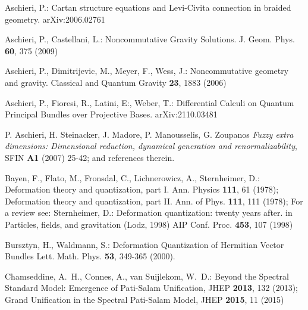 \documentclass[a4paper,11pt]{article}
\begin{document}
\begin{thebibliography}{99}

Aschieri, P.:\newblock
Cartan structure equations and Levi-Civita connection in braided geometry.\newblock
arXiv:2006.02761

Aschieri, P., Castellani, L.:\newblock
Noncommutative Gravity Solutions.
\newblock J. Geom. Phys. \textbf{60}, 375
(2009)

Aschieri, P., Dimitrijevic, M., Meyer, F., Wess, J.:\newblock
Noncommutative geometry and gravity.
\newblock Classical and Quantum Gravity \textbf{23}, 1883
(2006)	

Aschieri, P., Fioresi, R., Latini, E:, Weber, T.:\newblock
Differential Calculi on Quantum Principal Bundles over Projective Bases.\newblock
arXiv:2110.03481


P. Aschieri,  H. Steinacker, J. Madore,   P. Manousselis, G. Zoupanos
{\it Fuzzy extra dimensions: Dimensional reduction, dynamical generation and renormalizability},
SFIN {\bf A1} (2007) 25-42;
and references therein.

Bayen, F., Flato, M., Fronsdal, C., Lichnerowicz, A.,
Sternheimer, D.:
\newblock Deformation theory and quantization, part I.
Ann. Physics \textbf{111}, 61
(1978); 
Deformation theory and quantization, part II. Ann. of Phys. \textbf{111}, 111
(1978);
For a review see: Sternheimer, D.:
Deformation quantization: twenty years after.
in Particles, fields, and gravitation (Lodz, 1998)
AIP Conf. Proc. \textbf{453}, 107
(1998)

Bursztyn, H., Waldmann, S.:\newblock
Deformation Quantization of Hermitian Vector Bundles
\newblock Lett. Math. Phys. \textbf{53}, 349-365 (2000).

Chamseddine, A.~H., Connes, A., van Suijlekom, W.~D.:
\newblock Beyond the Spectral Standard Model: Emergence of Pati-Salam Unification,
\newblock JHEP \textbf{2013}, 132 (2013);
\newblock Grand Unification in the Spectral Pati-Salam Model,
\newblock JHEP \textbf{2015}, 11 (2015) 


\end{thebibliography}
\end{document}
